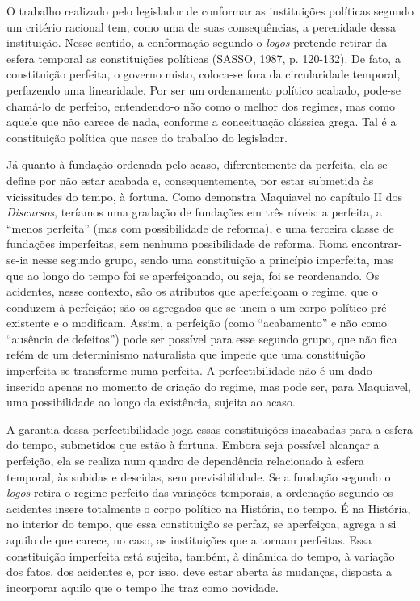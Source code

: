 O trabalho realizado pelo legislador de conformar as instituições
políticas segundo um critério racional tem, como uma de suas
consequências, a perenidade dessa instituição. Nesse sentido, a
conformação segundo o \emph{logos} pretende retirar da esfera temporal
as constituições políticas (SASSO, 1987, p. 120-132). De fato, a
constituição perfeita, o governo misto, coloca-se fora da circularidade
temporal, perfazendo uma linearidade. Por ser um ordenamento político
acabado, pode-se chamá-lo de perfeito, entendendo-o não como o melhor
dos regimes, mas como aquele que não carece de nada, conforme a
conceituação clássica grega. Tal é a constituição política que nasce do
trabalho do legislador.

Já quanto à fundação ordenada pelo acaso, diferentemente da perfeita,
ela se define por não estar acabada e, consequentemente, por estar
submetida às vicissitudes do tempo, à fortuna. Como demonstra Maquiavel
no capítulo II dos \emph{Discursos}, teríamos uma gradação de fundações
em três níveis: a perfeita, a ``menos perfeita'' (mas com possibilidade
de reforma), e uma terceira classe de fundações imperfeitas, sem nenhuma
possibilidade de reforma. Roma encontrar-se-ia nesse segundo grupo,
sendo uma constituição a princípio imperfeita, mas que ao longo do tempo
foi se aperfeiçoando, ou seja, foi se reordenando. Os acidentes, nesse
contexto, são os atributos que aperfeiçoam o regime, que o conduzem à
perfeição; são os agregados que se unem a um corpo político
pré-existente e o modificam. Assim, a perfeição (como ``acabamento'' e
não como ``ausência de defeitos'') pode ser possível para esse segundo
grupo, que não fica refém de um determinismo naturalista que impede que
uma constituição imperfeita se transforme numa perfeita. A
perfectibilidade não é um dado inserido apenas no momento de criação do
regime, mas pode ser, para Maquiavel, uma possibilidade ao longo da
existência, sujeita ao acaso.

A garantia dessa perfectibilidade joga essas constituições inacabadas
para a esfera do tempo, submetidos que estão à fortuna. Embora seja
possível alcançar a perfeição, ela se realiza num quadro de dependência
relacionado à esfera temporal, às subidas e descidas, sem
previsibilidade. Se a fundação segundo o \emph{logos} retira o regime
perfeito das variações temporais, a ordenação segundo os acidentes
insere totalmente o corpo político na História, no tempo. É na História,
no interior do tempo, que essa constituição se perfaz, se aperfeiçoa,
agrega a si aquilo de que carece, no caso, as instituições que a tornam
perfeitas. Essa constituição imperfeita está sujeita, também, à dinâmica
do tempo, à variação dos fatos, dos acidentes e, por isso, deve estar
aberta às mudanças, disposta a incorporar aquilo que o tempo lhe traz
como novidade.

